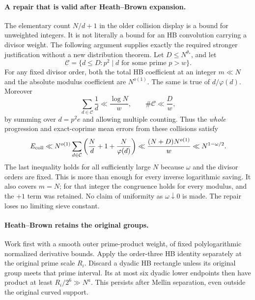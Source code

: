 \paragraph{A repair that is valid after Heath--Brown expansion.}
The elementary count $N/d+1$ in the older collision display is a
bound for unweighted integers. It is not literally a bound for an
HB convolution carrying a divisor weight. The following argument
supplies exactly the required stronger justification without a new
distribution theorem. Let $D\le N^{\theta_*}$, and let
\[
 \mathcal C=\{d\le D:p^2\mid d\text{ for some prime }p>w\}.
\]
For any fixed divisor order, both the total HB coefficient at an
integer $m\ll N$ and the absolute modulus coefficient are $N^{o(1)}$.
The same is true of $d/\varphi(d)$. Moreover
\[
 \sum_{d\in\mathcal C}\frac1d\ll\frac{\log N}{w},
 \qquad \#\mathcal C\ll\frac D w,
\]
by summing over $d=p^2e$ and allowing multiple counting. Thus the
\emph{whole} progression and exact-coprime mean errors from these
collisions satisfy
\begin{equation}\label{eq:actual-k-hb-collision-repair}
 E_{\rm coll}\ll N^{o(1)}
      \sum_{d\in\mathcal C}\left(\frac Nd+1+\frac N{\varphi(d)}\right)
 \ll\frac{(N+D)N^{o(1)}}w
 \ll N^{1-\omega/2}.
\end{equation}
The last inequality holds for all sufficiently large $N$ because
$\omega$ and the divisor orders are fixed. This is more than enough
for every inverse logarithmic saving. It also covers $m=N$; for that
integer the congruence holds for every modulus, and the $+1$ term
was retained. No claim of uniformity as $\omega\downarrow0$ is made.
The repair loses no limiting sieve constant.

\paragraph{Heath--Brown retains the original groups.}
Work first with a smooth outer prime-product weight, of fixed
polylogarithmic normalized derivative bounds. Apply the order-three
HB identity separately at the original prime scale $R_i$.
Discard a dyadic HB rectangle unless its original group meets that
prime interval. Its at most six dyadic lower endpoints then have
product at least $R_i/2^6\gg N^a$. This persists after Mellin
separation, even outside the original curved support.

